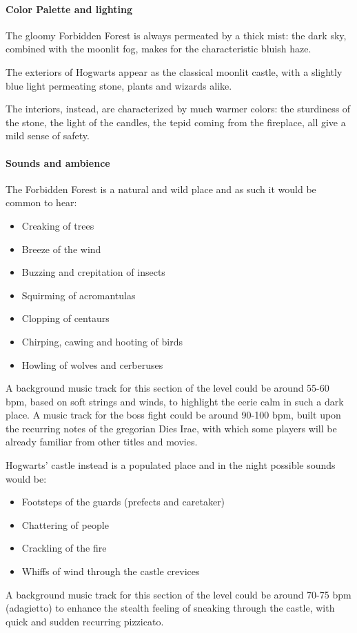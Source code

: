 \paragraph{Color Palette and lighting}
The gloomy Forbidden Forest is always permeated by a thick mist: the dark sky, combined with the moonlit fog, makes for the characteristic bluish haze.

The exteriors of Hogwarts appear as the classical moonlit castle, with a slightly blue light permeating stone, plants and wizards alike.

The interiors, instead, are characterized by much warmer colors: the sturdiness of the stone, the light of the candles, the tepid coming from the fireplace, all give a mild sense of safety.

\clearpage

\paragraph{Sounds and ambience}

The Forbidden Forest is a natural and wild place and as such it would be common to hear:
\begin{itemize}
	\item Creaking of trees
	\item Breeze of the wind
	\item Buzzing and crepitation of insects
	\item Squirming of acromantulas
	\item Clopping of centaurs 
	\item Chirping, cawing and hooting of birds
	\item Howling of wolves and cerberuses
\end{itemize}
A background music track for this section of the level could be around 55-60 bpm, based on soft strings and winds, to highlight the eerie calm in such a dark place.
A music track for the boss fight could be around 90-100 bpm, built upon the recurring notes of the gregorian Dies Irae, with which some players will be already familiar from other titles and movies.

Hogwarts' castle instead is a populated place and in the night possible sounds would be:
\begin{itemize}
	\item Footsteps of the guards (prefects and caretaker)
	\item Chattering of people
	\item Crackling of the fire
	\item Whiffs of wind through the castle crevices
\end{itemize}
A background music track for this section of the level could be around 70-75 bpm (adagietto) to enhance the stealth feeling of sneaking through the castle, with quick and sudden recurring pizzicato.

\pagebreak